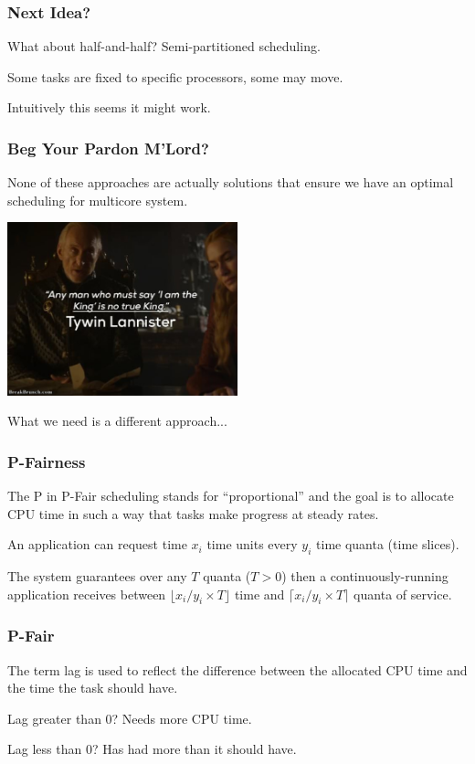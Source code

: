 \begin{frame}
\frametitle{Next Idea?}

What about half-and-half? \alert{Semi-partitioned} scheduling.

Some tasks are fixed to specific processors, some may move.

Intuitively this seems it might work.

\end{frame}

\begin{frame}
\frametitle{Beg Your Pardon M'Lord?}

None of these approaches are actually solutions that ensure we have an optimal scheduling for multicore system. 

\begin{center}
	\includegraphics[width=0.5\textwidth]{images/trueking.jpg}
\end{center}

What we need is a different approach...

\end{frame}

\begin{frame}
\frametitle{P-Fairness}

The P in P-Fair scheduling stands for ``proportional'' and the goal is to allocate CPU time in such a way that tasks make progress at steady rates.

An application can request time $x_i$ time units every $y_i$ time quanta (time slices).

The system guarantees over any $T$ quanta ($T>0$) then a continuously-running application receives between $\lfloor x_i/y_i \times T\rfloor$ time and $\lceil x_i/y_i \times T\rceil$ quanta of service.

\end{frame}

\begin{frame}
\frametitle{P-Fair}

The term \alert{lag} is used to reflect the difference between the allocated CPU time and the time the task should have.

Lag greater than 0? Needs more CPU time.

Lag less than 0? Has had more than it should have.

\end{frame}

